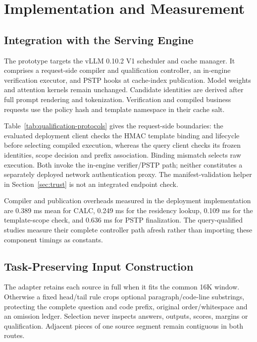 \section{Implementation and Measurement}
\label{sec:implementation}

\subsection{Integration with the Serving Engine}
The prototype targets the vLLM 0.10.2 V1 scheduler and cache manager. It comprises a request-side compiler and qualification controller, an in-engine verification executor, and PSTP hooks at cache-index publication. Model weights and attention kernels remain unchanged. Candidate identities are derived after full prompt rendering and tokenization. Verification and compiled business requests use the policy hash and template namespace in their cache salt.

Table~\ref{tab:qualification-protocols} gives the request-side boundaries: the evaluated deployment client checks the HMAC template binding and lifecycle before selecting compiled execution, whereas the query client checks its frozen identities, scope decision and prefix association. Binding mismatch selects raw execution. Both invoke the in-engine verifier/PSTP path; neither constitutes a separately deployed network authentication proxy. The manifest-validation helper in Section~\ref{sec:trust} is not an integrated endpoint check.

Compiler and publication overheads measured in the deployment implementation are 0.389 ms mean for CALC, 0.249 ms for the residency lookup, 0.109 ms for the template-scope check, and 0.636 ms for PSTP finalization. The query-qualified studies measure their complete controller path afresh rather than importing these component timings as constants.

\subsection{Task-Preserving Input Construction}
The adapter retains each source in full when it fits the common 16K window. Otherwise a fixed head/tail rule crops optional paragraph/code-line substrings, protecting the complete question and code prefix, original order/whitespace and an omission ledger. Selection never inspects answers, outputs, scores, margins or qualification. Adjacent pieces of one source segment remain contiguous in both routes.

